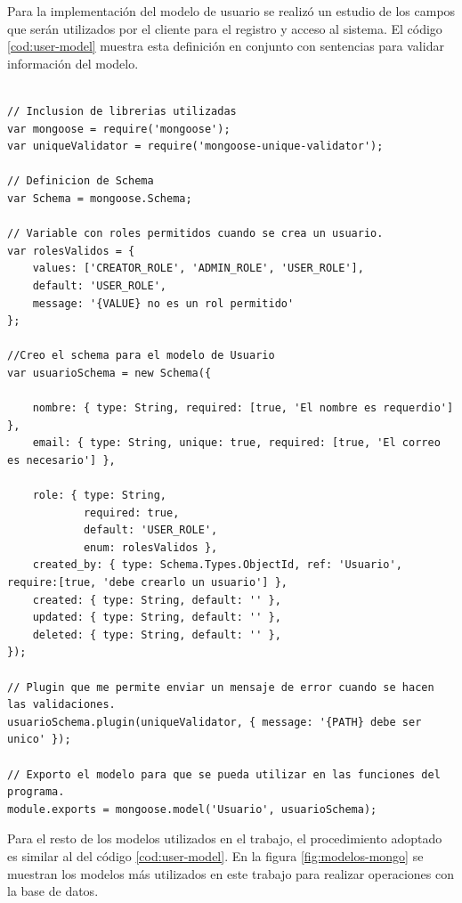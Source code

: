 Para la implementación del modelo de usuario se realizó un estudio de los campos que serán utilizados por el cliente para el registro y acceso al sistema. El código  \ref{cod:user-model}  muestra esta definición en conjunto con sentencias para validar información del modelo.

\begin{lstlisting}[label=cod:user-model,caption=Definición de Schema para el modelo de usuario.] 

// Inclusion de librerias utilizadas
var mongoose = require('mongoose');
var uniqueValidator = require('mongoose-unique-validator');

// Definicion de Schema
var Schema = mongoose.Schema;

// Variable con roles permitidos cuando se crea un usuario.
var rolesValidos = {
    values: ['CREATOR_ROLE', 'ADMIN_ROLE', 'USER_ROLE'],
    default: 'USER_ROLE',
    message: '{VALUE} no es un rol permitido'
};

//Creo el schema para el modelo de Usuario
var usuarioSchema = new Schema({

    nombre: { type: String, required: [true, 'El nombre es requerdio'] },
    email: { type: String, unique: true, required: [true, 'El correo es necesario'] },
    
    role: { type: String, 
            required: true, 
            default: 'USER_ROLE', 
            enum: rolesValidos },
    created_by: { type: Schema.Types.ObjectId, ref: 'Usuario', require:[true, 'debe crearlo un usuario'] },
    created: { type: String, default: '' },
    updated: { type: String, default: '' },
    deleted: { type: String, default: '' },
});

// Plugin que me permite enviar un mensaje de error cuando se hacen las validaciones.
usuarioSchema.plugin(uniqueValidator, { message: '{PATH} debe ser unico' });

// Exporto el modelo para que se pueda utilizar en las funciones del programa.
module.exports = mongoose.model('Usuario', usuarioSchema);

\end{lstlisting}

Para el resto de los modelos utilizados en el trabajo, el procedimiento adoptado es similar al del código \ref{cod:user-model}. En la figura \ref{fig:modelos-mongo} se muestran los modelos más utilizados en este trabajo para realizar operaciones con la base de datos. 

